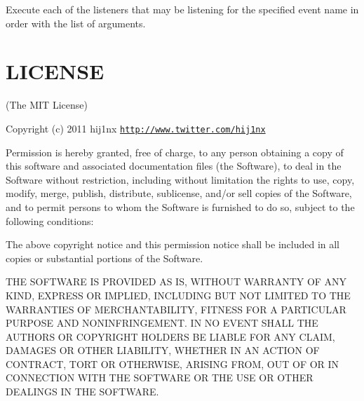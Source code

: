 Execute each of the listeners that may be listening for the specified event name in order with the list of arguments.

\section*{L\+I\+C\+E\+N\+SE}

(The M\+IT License)

Copyright (c) 2011 hij1nx \href{http://www.twitter.com/hij1nx}{\tt http\+://www.\+twitter.\+com/hij1nx}

Permission is hereby granted, free of charge, to any person obtaining a copy of this software and associated documentation files (the \textquotesingle{}Software\textquotesingle{}), to deal in the Software without restriction, including without limitation the rights to use, copy, modify, merge, publish, distribute, sublicense, and/or sell copies of the Software, and to permit persons to whom the Software is furnished to do so, subject to the following conditions\+:

The above copyright notice and this permission notice shall be included in all copies or substantial portions of the Software.

T\+HE S\+O\+F\+T\+W\+A\+RE IS P\+R\+O\+V\+I\+D\+ED \textquotesingle{}AS IS\textquotesingle{}, W\+I\+T\+H\+O\+UT W\+A\+R\+R\+A\+N\+TY OF A\+NY K\+I\+ND, E\+X\+P\+R\+E\+SS OR I\+M\+P\+L\+I\+ED, I\+N\+C\+L\+U\+D\+I\+NG B\+UT N\+OT L\+I\+M\+I\+T\+ED TO T\+HE W\+A\+R\+R\+A\+N\+T\+I\+ES OF M\+E\+R\+C\+H\+A\+N\+T\+A\+B\+I\+L\+I\+TY, F\+I\+T\+N\+E\+SS F\+OR A P\+A\+R\+T\+I\+C\+U\+L\+AR P\+U\+R\+P\+O\+SE A\+ND N\+O\+N\+I\+N\+F\+R\+I\+N\+G\+E\+M\+E\+NT. IN NO E\+V\+E\+NT S\+H\+A\+LL T\+HE A\+U\+T\+H\+O\+RS OR C\+O\+P\+Y\+R\+I\+G\+HT H\+O\+L\+D\+E\+RS BE L\+I\+A\+B\+LE F\+OR A\+NY C\+L\+A\+IM, D\+A\+M\+A\+G\+ES OR O\+T\+H\+ER L\+I\+A\+B\+I\+L\+I\+TY, W\+H\+E\+T\+H\+ER IN AN A\+C\+T\+I\+ON OF C\+O\+N\+T\+R\+A\+CT, T\+O\+RT OR O\+T\+H\+E\+R\+W\+I\+SE, A\+R\+I\+S\+I\+NG F\+R\+OM, O\+UT OF OR IN C\+O\+N\+N\+E\+C\+T\+I\+ON W\+I\+TH T\+HE S\+O\+F\+T\+W\+A\+RE OR T\+HE U\+SE OR O\+T\+H\+ER D\+E\+A\+L\+I\+N\+GS IN T\+HE S\+O\+F\+T\+W\+A\+RE. 